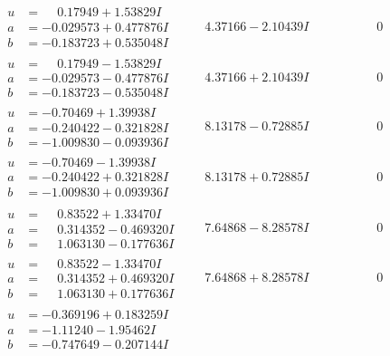 \documentclass[1p]{elsarticle_modified}
\theoremstyle{definition}
\begin{document}
$$\begin{array}{c|c|c}
\begin{aligned}
u &= \phantom{-}0.17949 + 1.53829 I \\
a &= -0.029573 + 0.477876 I \\
b &= -0.183723 + 0.535048 I\end{aligned}
 & \phantom{-}4.37166 - 2.10439 I & \phantom{-0.000000 } 0 \\ \hline\begin{aligned}
u &= \phantom{-}0.17949 - 1.53829 I \\
a &= -0.029573 - 0.477876 I \\
b &= -0.183723 - 0.535048 I\end{aligned}
 & \phantom{-}4.37166 + 2.10439 I & \phantom{-0.000000 } 0 \\ \hline\begin{aligned}
u &= -0.70469 + 1.39938 I \\
a &= -0.240422 - 0.321828 I \\
b &= -1.009830 - 0.093936 I\end{aligned}
 & \phantom{-}8.13178 - 0.72885 I & \phantom{-0.000000 } 0 \\ \hline\begin{aligned}
u &= -0.70469 - 1.39938 I \\
a &= -0.240422 + 0.321828 I \\
b &= -1.009830 + 0.093936 I\end{aligned}
 & \phantom{-}8.13178 + 0.72885 I & \phantom{-0.000000 } 0 \\ \hline\begin{aligned}
u &= \phantom{-}0.83522 + 1.33470 I \\
a &= \phantom{-}0.314352 - 0.469320 I \\
b &= \phantom{-}1.063130 - 0.177636 I\end{aligned}
 & \phantom{-}7.64868 - 8.28578 I & \phantom{-0.000000 } 0 \\ \hline\begin{aligned}
u &= \phantom{-}0.83522 - 1.33470 I \\
a &= \phantom{-}0.314352 + 0.469320 I \\
b &= \phantom{-}1.063130 + 0.177636 I\end{aligned}
 & \phantom{-}7.64868 + 8.28578 I & \phantom{-0.000000 } 0 \\ \hline\begin{aligned}
u &= -0.369196 + 0.183259 I \\
a &= -1.11240 - 1.95462 I \\
b &= -0.747649 - 0.207144 I\end{aligned}

\end{array}$$
\end{document}
